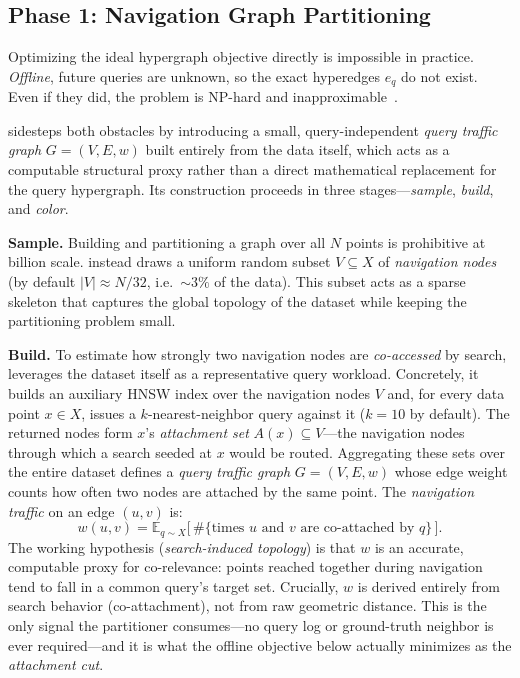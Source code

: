 \subsection{Phase 1: Navigation Graph Partitioning}
\label{sec:nav_graph}
Optimizing the ideal hypergraph objective directly is impossible in practice. \emph{Offline}, future queries are unknown, so the exact hyperedges $e_q$ do not exist. Even if they did, the problem is NP-hard and inapproximable~\cite{andreev2006}.

\sysname sidesteps both obstacles by introducing a small, query-independent \emph{query traffic graph} $G=(V,E,w)$ built entirely from the data itself, which acts as a computable structural proxy rather than a direct mathematical replacement for the query hypergraph. Its construction proceeds in three stages---\emph{sample}, \emph{build}, and \emph{color}.

\noindent\textbf{Sample.} Building and partitioning a graph over all $N$ points is prohibitive at billion scale. \sysname instead draws a uniform random subset $V\subseteq X$ of \emph{navigation nodes} (by default $|V|\approx N/32$, i.e.\ $\sim\!3\%$ of the data). This subset acts as a sparse skeleton that captures the global topology of the dataset while keeping the partitioning problem small.

\noindent\textbf{Build.} To estimate how strongly two navigation nodes are \emph{co-accessed} by search, \sysname leverages the dataset itself as a representative query workload. Concretely, it builds an auxiliary HNSW index over the navigation nodes $V$ and, for every data point $x\in X$, issues a $k$-nearest-neighbor query against it ($k{=}10$ by default). The returned nodes form $x$'s \emph{attachment set} $A(x)\subseteq V$---the navigation nodes through which a search seeded at $x$ would be routed. Aggregating these sets over the entire dataset defines a \emph{query traffic graph} $G=(V,E,w)$ whose edge weight counts how often two nodes are attached by the same point. The \emph{navigation traffic} on an edge $(u,v)$ is:
\begin{equation}
\label{eq:traffic}
w(u,v)=\mathbb{E}_{q\sim X}\bigl[\,\#\{\text{times } u \text{ and } v \text{ are co-attached by } q\}\,\bigr].
\end{equation}
The working hypothesis (\emph{search-induced topology}) is that $w$ is an accurate, computable proxy for co-relevance: points reached together during navigation tend to fall in a common query's target set. Crucially, $w$ is derived entirely from search behavior (co-attachment), not from raw geometric distance. This is the only signal the partitioner consumes---no query log or ground-truth neighbor is ever required---and it is what the offline objective below actually minimizes as the \emph{attachment cut}.

